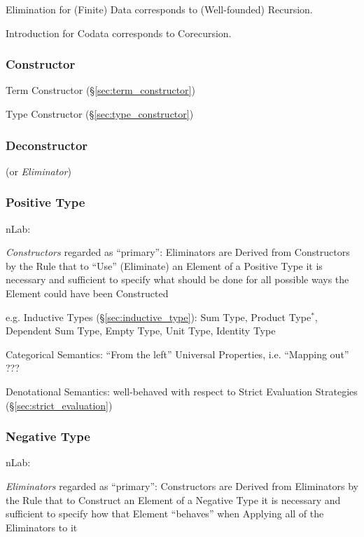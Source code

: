 Elimination for (Finite) Data corresponds to (Well-founded)
Recursion.

Introduction for Codata corresponds to Corecursion.




\subsubsection{Constructor}\label{sec:constructor}

Term Constructor (\S\ref{sec:term_constructor})

Type Constructor (\S\ref{sec:type_constructor})



\subsubsection{Deconstructor}\label{sec:deconstructor}

(or \emph{Eliminator})



\subsubsection{Positive Type}\label{sec:positive_type}

nLab:

\emph{Constructors} regarded as ``primary'': Eliminators are Derived
from Constructors by the Rule that to ``Use'' (Eliminate) an Element
of a Positive Type it is necessary and sufficient to specify what
should be done for all possible ways the Element could have been
Constructed

e.g. Inductive Types (\S\ref{sec:inductive_type}): Sum Type, Product
Type$^*$, Dependent Sum Type, Empty Type, Unit Type, Identity Type

Categorical Semantics: ``From the left'' Universal Properties, i.e.
``Mapping out'' ???

Denotational Semantics: well-behaved with respect to Strict Evaluation
Strategies (\S\ref{sec:strict_evaluation})



\subsubsection{Negative Type}\label{sec:negative_type}

nLab:

\emph{Eliminators} regarded as ``primary'': Constructors are Derived
from Eliminators by the Rule that to Construct an Element of a
Negative Type it is necessary and sufficient to specify how that
Element ``behaves'' when Applying all of the Eliminators to it

